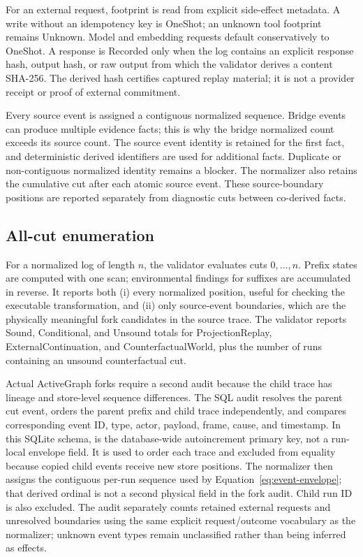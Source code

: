 For an external request, footprint is read from explicit side-effect metadata.
A write without an idempotency key is OneShot; an unknown tool footprint remains
Unknown.  Model and embedding requests default conservatively to OneShot.  A
response is Recorded only when the log contains an explicit response hash,
output hash, or raw output from which the validator derives a content SHA-256.
The derived hash certifies captured replay material; it is not a provider
receipt or proof of external commitment.

Every source event is assigned a contiguous normalized sequence.  Bridge
events can produce multiple evidence facts; this is why the bridge normalized
count exceeds its source count.  The source event identity is retained for the
first fact, and deterministic derived identifiers are used for additional
facts.  Duplicate or non-contiguous normalized identity remains a blocker.  The
normalizer also retains the cumulative cut after each atomic source event.
These source-boundary positions are reported separately from diagnostic cuts
between co-derived facts.

\subsection{All-cut enumeration}

For a normalized log of length $n$, the validator evaluates cuts
$0,\ldots,n$.  Prefix states are computed with one scan; environmental findings
for suffixes are accumulated in reverse.  It reports both (i) every normalized
position, useful for checking the executable transformation, and (ii) only
source-event boundaries, which are the physically meaningful fork candidates
in the source trace.  The validator reports Sound, Conditional, and Unsound
totals for ProjectionReplay, ExternalContinuation, and CounterfactualWorld,
plus the number of runs containing an unsound counterfactual cut.

Actual ActiveGraph forks require a second audit because the child trace has
lineage and store-level sequence differences.  The SQL audit resolves the
parent cut event, orders the parent prefix and child trace independently, and
compares corresponding event ID, type, actor, payload, frame, cause, and
timestamp.  In this SQLite schema,  is the database-wide
autoincrement primary key, not a run-local envelope field.  It is used to order
each trace and excluded from equality because copied child events receive new
store positions.  The normalizer then assigns the contiguous per-run sequence
used by Equation~\ref{eq:event-envelope}; that derived ordinal is not a second physical field in the
fork audit.  Child run ID is also excluded.  The audit separately counts
retained external requests and unresolved boundaries using the same explicit
request/outcome vocabulary as the normalizer; unknown event types remain
unclassified rather than being inferred as effects.

